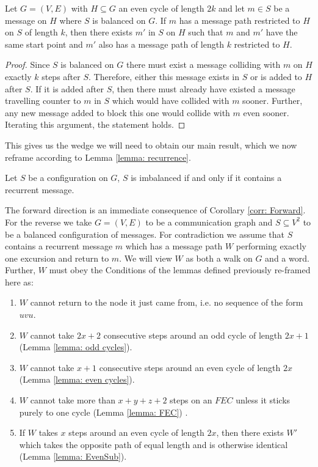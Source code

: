 \begin{lemma}
    Let $G=(V,E)$ with $H\subseteq G$ an even cycle of length $2k$ and let $m \in S$ be a message on $H$ where $S$ is balanced on $G$. If $m$ has a message path restricted to $H$ on $S$ of length $k$, then there exists $m'$ in $S$ on $H$ such that $m$ and $m'$ have the same start point and $m'$ also has a message path of length $k$ restricted to $H$.
    \label{lemma: EvenSub}
\end{lemma}
\begin{proof}
    Since $S$ is balanced on $G$ there must exist a message colliding with $m$ on $H$ exactly $k$ steps after $S$. Therefore, either this message exists in $S$ or is added to $H$ after $S$. If it is added after $S$, then there must already have existed a message travelling counter to $m$ in $S$ which would have collided with $m$ sooner. Further, any new message added to block this one would collide with $m$ even sooner. Iterating this argument, the statement holds.
\end{proof}
This gives us the wedge we will need to obtain our main result, which we now reframe according to Lemma \ref{lemma: recurrence}.
\begin{theorem}
    Let $S$ be a configuration on $G$, $S$ is imbalanced if and only if it contains a recurrent message.
\end{theorem}
The forward direction is an immediate consequence of Corollary \ref{corr: Forward}. For the reverse we take $G=(V,E)$ to be a communication graph and $S \subseteq V^2$ to be a balanced configuration of messages. For contradiction we assume that $S$ contains a recurrent message $m$ which has a message path $W$ performing exactly one excursion and return to $m$. We will view $W$ as both a walk on $G$ and a word. Further, $W$ must obey the Conditions of the lemmas defined previously re-framed here as:
\begin{enumerate}
    \item $W$ cannot return to the node it just came from, i.e. no sequence of the form $uvu$. \label{cond: No leaves}
    \item $W$ cannot take $2x+2$ consecutive steps around an odd cycle of length $2x+1$ (Lemma \ref{lemma: odd cycles}). \label{cond: odd cycle}
    \item $W$ cannot take $x+1$ consecutive steps around an even cycle of length $2x$ (Lemma \ref{lemma: even cycles}). \label{cond: even cycle}
    \item $W$ cannot take more than $x+y+z+2$ steps on an $FEC$ unless it sticks purely to one cycle (Lemma \ref{lemma: FEC}) .\label{cond: FEC}
    \item If $W$ takes $x$ steps around an even cycle of length $2x$, then there exists $W'$ which takes the opposite path of equal length and is otherwise identical (Lemma \ref{lemma: EvenSub}). \label{cond: even replacement}
\end{enumerate}
